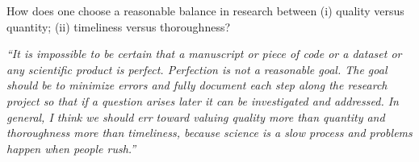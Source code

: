 \documentclass[portrait,11pt]{seminar}
\begin{document}
 


\es
\bs
How does one choose a reasonable balance in research between (i) quality versus quantity; (ii) timeliness versus thoroughness?

{\it ``It is impossible to be certain that a manuscript or piece of code or a dataset or any scientific product is perfect. Perfection is not a reasonable goal. The goal should be to minimize errors and fully document each step along the research project so that if a question arises later it can be investigated and addressed. In general, I think we should err toward valuing quality more than quantity and thoroughness more than timeliness, because science is a slow process and problems happen when people rush.''}



\end{document}
